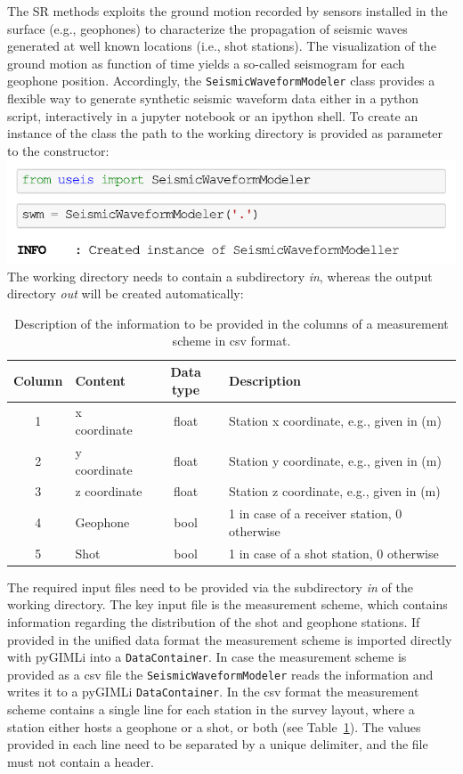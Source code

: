 \documentclass[a4paper,fleqn]{cas-sc}
\begin{document}
The SR methods exploits the ground motion recorded by sensors installed in the surface (e.g., geophones) to characterize the propagation of seismic waves generated at well known locations (i.e., shot stations). 
The visualization of the ground motion as function of time yields a so-called seismogram for each geophone position.
Accordingly, the \texttt{SeismicWaveformModeler} class provides a flexible way to generate synthetic seismic waveform data either in a python script, interactively in a jupyter notebook or an ipython shell. To create an instance of the class the path to the working directory is provided as parameter to the constructor:
\newline
\includegraphics[width=.5\textwidth]{./figures/create_swm.pdf}
\newline
\\The working directory needs to contain a subdirectory \textit{in}, whereas the output directory \textit{out} will be created automatically:


\begin{table}[pos=h]
    \caption{Description of the information to be provided in the columns of a measurement scheme in csv format.}
    \centering
    \begin{tabular}{clcl}
        \toprule
        Column & \textbf{Content} & \textbf{Data type} & \textbf{Description} \\
        \midrule
        1 & x coordinate & float & Station x coordinate, e.g., given in (m) \\ 
        2 & y coordinate & float & Station y coordinate, e.g., given in (m) \\ 
        3 & z coordinate & float & Station z coordinate, e.g., given in (m) \\ 
        4 & Geophone & bool & 1 in case of a receiver station, 0 otherwise \\ 
        5 & Shot & bool & 1 in case of a shot station, 0 otherwise \\
        \bottomrule
    \end{tabular}
    \label{tab:scheme}
\end{table}
The required input files need to be provided via the subdirectory \textit{in} of the working directory. The key input file is the measurement scheme, which contains information regarding the distribution of the shot and geophone stations. If provided in the unified data format the measurement scheme is imported directly with pyGIMLi into a \texttt{DataContainer}. In case the measurement scheme is provided as a csv file the \texttt{SeismicWaveformModeler} reads the information and writes it to a pyGIMLi \texttt{DataContainer}. In the csv format the measurement scheme contains a single line for each station in the survey layout, where a station either hosts a geophone or a shot, or both (see Table~\ref{tab:scheme}). The values provided in each line need to be separated by a unique delimiter, and the file must not contain a header.
\end{document}
